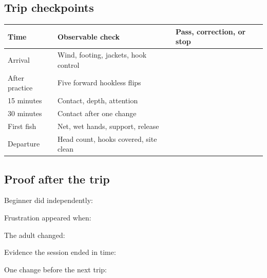 \subsection*{Trip checkpoints}
\begin{tabularx}{\linewidth}{@{}p{.16\linewidth}p{.26\linewidth}L@{}}
\toprule
Time & Observable check & Pass, correction, or stop\\
\midrule
Arrival & Wind, footing, jackets, hook control & \rule{0pt}{2.5em}\dotfill\\
After practice & Five forward hookless flips & \rule{0pt}{2.5em}\dotfill\\
15 minutes & Contact, depth, attention & \rule{0pt}{2.5em}\dotfill\\
30 minutes & Contact after one change & \rule{0pt}{2.5em}\dotfill\\
First fish & Net, wet hands, support, release & \rule{0pt}{2.5em}\dotfill\\
Departure & Head count, hooks covered, site clean & \rule{0pt}{2.5em}\dotfill\\
\bottomrule
\end{tabularx}

\subsection*{Proof after the trip}
\noindent Beginner did independently:\ \dotfill\par\vspace{.8em}
\noindent Frustration appeared when:\ \dotfill\par\vspace{.8em}
\noindent The adult changed:\ \dotfill\par\vspace{.8em}
\noindent Evidence the session ended in time:\ \dotfill\par\vspace{.8em}
\noindent One change before the next trip:\ \dotfill

